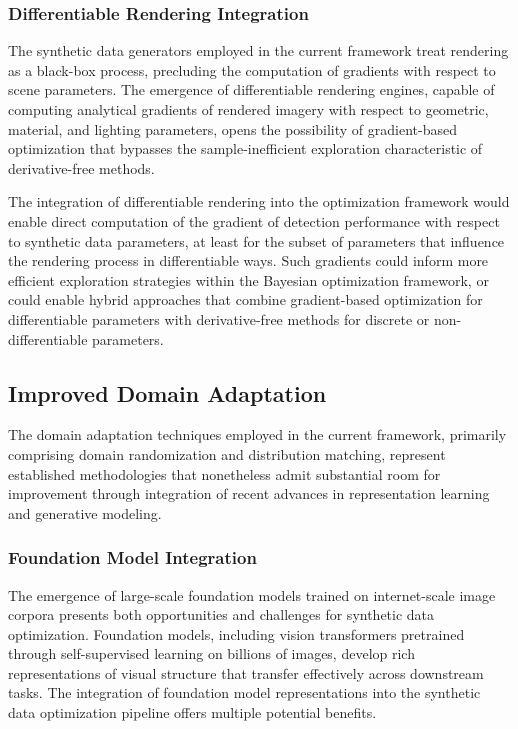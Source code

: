 \subsubsection{Differentiable Rendering Integration}
\label{subsubsec:differentiable_rendering}

The synthetic data generators employed in the current framework treat rendering as a black-box process, precluding the computation of gradients with respect to scene parameters. The emergence of differentiable rendering engines, capable of computing analytical gradients of rendered imagery with respect to geometric, material, and lighting parameters, opens the possibility of gradient-based optimization that bypasses the sample-inefficient exploration characteristic of derivative-free methods.

The integration of differentiable rendering into the optimization framework would enable direct computation of the gradient of detection performance with respect to synthetic data parameters, at least for the subset of parameters that influence the rendering process in differentiable ways. Such gradients could inform more efficient exploration strategies within the Bayesian optimization framework, or could enable hybrid approaches that combine gradient-based optimization for differentiable parameters with derivative-free methods for discrete or non-differentiable parameters.

\subsection{Improved Domain Adaptation}
\label{subsec:improved_adaptation}

The domain adaptation techniques employed in the current framework, primarily comprising domain randomization and distribution matching, represent established methodologies that nonetheless admit substantial room for improvement through integration of recent advances in representation learning and generative modeling.

\subsubsection{Foundation Model Integration}
\label{subsubsec:foundation_models}

The emergence of large-scale foundation models trained on internet-scale image corpora presents both opportunities and challenges for synthetic data optimization. Foundation models, including vision transformers pretrained through self-supervised learning on billions of images, develop rich representations of visual structure that transfer effectively across downstream tasks. The integration of foundation model representations into the synthetic data optimization pipeline offers multiple potential benefits.

